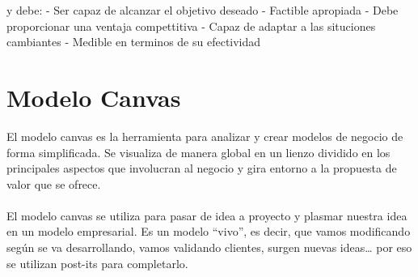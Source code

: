 \item{ y debe:}
- Ser capaz de alcanzar el objetivo deseado
- Factible apropiada
- Debe proporcionar una ventaja compettitiva
- Capaz de adaptar a las situciones cambiantes
- Medible en terminos de su efectividad

\section{Modelo Canvas}
\item{
El modelo canvas es la herramienta para analizar y crear modelos de negocio de forma simplificada. Se visualiza de manera global en un lienzo dividido en los principales aspectos que involucran al negocio y gira entorno a la propuesta de valor que se ofrece.\\\\
El modelo canvas se utiliza para pasar de idea a proyecto y plasmar nuestra idea en un modelo empresarial. Es un modelo “vivo”, es decir, que vamos modificando según se va desarrollando, vamos validando clientes, surgen nuevas ideas… por eso se utilizan post-its para completarlo.
}

